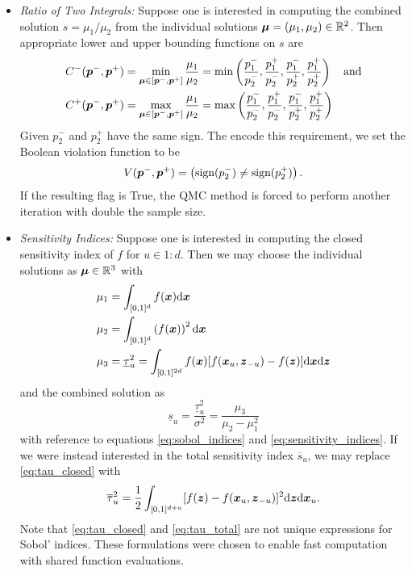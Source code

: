 \documentclass{article}[12pt]
\begin{document}
\begin{itemize}
    \item \emph{Ratio of Two Integrals:} Suppose one is interested in computing the combined solution $s = \mu_1/\mu_2$ from the individual solutions $\boldsymbol{\mu} = (\mu_1,\mu_2) \in \mathbb{R}^2$. Then appropriate lower and upper bounding functions on $s$ are 
    \begin{align*}
        C^-(\boldsymbol{p}^-,\boldsymbol{p}^+) &= \min_{\boldsymbol{\mu} \in [\boldsymbol{p}^-,\boldsymbol{p}^+]} \frac{\mu_1}{\mu_2} = \min\left(\frac{p_1^-}{p_2^-},\frac{p_1^+}{p_2^-},\frac{p_1^-}{p_2^+},\frac{p_1^+}{p_2^+}\right) \quad \text{and}\\
        C^+(\boldsymbol{p}^-,\boldsymbol{p}^+) &= \max_{\boldsymbol{\mu} \in [\boldsymbol{p}^-,\boldsymbol{p}^+]} \frac{\mu_1}{\mu_2} = \max\left(\frac{p_1^-}{p_2^-},\frac{p_1^+}{p_2^-},\frac{p_1^-}{p_2^+},\frac{p_1^+}{p_2^+}\right)
    \end{align*}
    Given $p_2^-$ and $p_2^+$ have the same sign. The encode this requirement, we set the Boolean violation function to be 
    $$V(\boldsymbol{p}^-,\boldsymbol{p}^+) = \left(\text{sign}(p_2^-) \neq \text{sign}(p_2^+)\right).$$
    If the resulting flag is True, the QMC method is forced to perform another iteration with double the sample size. 
    \item \emph{Sensitivity Indices:} Suppose one is interested in computing the closed sensitivity index of $f$ for $u \in 1:d$. Then we may choose the individual solutions as $\boldsymbol{\mu} \in \mathbb{R}^3$ with
    \begin{align}
        \mu_1 &= \int_{[0,1]^d} f(\boldsymbol{x})\mathrm{d}\boldsymbol{x} \label{mu1} \\
        \mu_2 &= \int_{[0,1]^d} \left(f(\boldsymbol{x})\right)^2\mathrm{d}\boldsymbol{x}  \label{mu2} \\
        \mu_3 &= \underline{\tau}_u^2 = \int_{[0,1]^{2d}} f(\boldsymbol{x})[f(\boldsymbol{x}_u,\boldsymbol{z}_{-u})-f(\boldsymbol{z})]\mathrm{d}\boldsymbol{x}\mathrm{d}\boldsymbol{z} \label{eq:tau_closed}
    \end{align}
    and the combined solution as
    $$\underline{s}_u = \frac{\underline{\tau}_u^2}{\sigma^2} = \frac{\mu_3}{\mu_2-\mu_1^2}$$
    with reference to equations \eqref{eq:sobol_indices} and \eqref{eq:sensitivity_indices}. If we were instead interested in the total sensitivity index $\overline{s}_u$, we may replace \eqref{eq:tau_closed} with
    \begin{equation}
        \overline{\tau}_u^2 = \frac{1}{2}\int_{[0,1]^{d+u}} [f(\boldsymbol{z})-f(\boldsymbol{x}_u,\boldsymbol{z}_{-u})]^2\mathrm{d}\boldsymbol{z}\mathrm{d}\boldsymbol{x}_u.
    \label{eq:tau_total}
    \end{equation}
    Note that \eqref{eq:tau_closed} and \eqref{eq:tau_total} are not unique expressions for Sobol' indices. These formulations were chosen to enable fast computation with shared function evaluations. 
    

\end{itemize}
\end{document}
